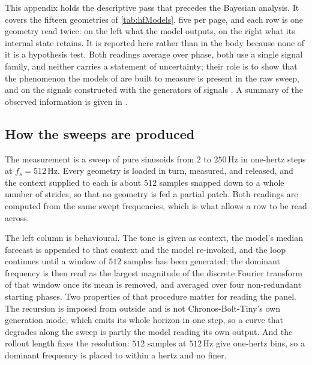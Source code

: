 This appendix holds the descriptive pass that precedes the Bayesian analysis. It covers the fifteen geometries of \autoref{tab:hfModels}, five per page, and each row is one geometry read twice: on the left what the model outputs, on the right what its internal state retains. It is reported here rather than in the body because none of it is a hypothesis test. Both readings average over phase, both use a single signal family, and neither carries a statement of uncertainty; their role is to show that the phenomenon the models of  are built to measure is present in the raw sweep, and on the signals constructed with the generators of signals . A summary of the observed information is given in .

\subsection{How the sweeps are produced}

The measurement is a sweep of pure sinusoids from $2$ to $250$\,Hz in one-hertz steps at $f_s=512$\,Hz. Every geometry is loaded in turn, measured, and released, and the context supplied to each is about $512$ samples snapped down to a whole number of strides, so that no geometry is fed a partial patch. Both readings are computed from the same swept frequencies, which is what allows a row to be read across.

The left column is behavioural. The tone is given as context, the model's median forecast is appended to that context and the model re-invoked, and the loop continues until a window of $512$ samples has been generated; the dominant frequency is then read as the largest magnitude of the discrete Fourier transform of that window once its mean is removed, and averaged over four non-redundant starting phases. Two properties of that procedure matter for reading the panel. The recursion is imposed from outside and is not Chronos-Bolt-Tiny's own generation mode, which emits its whole horizon in one step, so a curve that degrades along the sweep is partly the model reading its own output. And the rollout length fixes the resolution: $512$ samples at $512$\,Hz give one-hertz bins, so a dominant frequency is placed to within a hertz and no finer.

